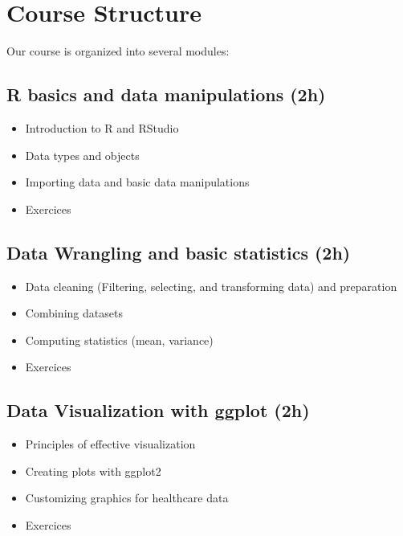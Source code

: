\documentclass[
]{book}
\providecommand{\tightlist}{%
  \setlength{\itemsep}{0pt}\setlength{\parskip}{0pt}}
\begin{document}
\section{Course Structure}\label{course-structure}

Our course is organized into several modules:

\subsection{R basics and data manipulations (2h)}\label{r-basics-and-data-manipulations-2h}

\begin{itemize}
\tightlist
\item
  Introduction to R and RStudio
\item
  Data types and objects
\item
  Importing data and basic data manipulations
\item
  Exercices
\end{itemize}

\subsection{Data Wrangling and basic statistics (2h)}\label{data-wrangling-and-basic-statistics-2h}

\begin{itemize}
\tightlist
\item
  Data cleaning (Filtering, selecting, and transforming data) and preparation
\item
  Combining datasets
\item
  Computing statistics (mean, variance)
\item
  Exercices
\end{itemize}

\subsection{Data Visualization with ggplot (2h)}\label{data-visualization-with-ggplot-2h}

\begin{itemize}
\tightlist
\item
  Principles of effective visualization
\item
  Creating plots with ggplot2
\item
  Customizing graphics for healthcare data
\item
  Exercices
\end{itemize}
\end{document}
